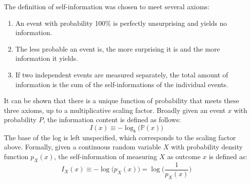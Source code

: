 \documentclass{article}
\begin{document}
  The definition of self-information was chosen to meet several axioms: 
  \begin{enumerate}
      \item An event with probability 100\% is perfectly unsurprising and yields no information.
      \item The less probable an event is, the more surprising it is and the more information it yields.
      \item If two independent events are measured separately, the total amount of information is the sum of the self-informations of the individual events. 
  \end{enumerate}
  It can be shown that there is a unique function of probability that meets these three axioms, up to a multiplicative scaling factor. Broadly given an event $x$ with probability $P$, the information content is defined as follows: 
  \[I(x) \equiv - \log_b \big( \mathbb{P}(x)\big)\]
  The base of the log is left unspecified, which corresponds to the scaling factor above. Formally, given a continuous random variable $X$ with probability density function $p_X (x)$, the self-information of measuring $X$ as outcome $x$ is defined as:
  \[I_X (x) \equiv - \log \big( p_X (x) \big) = \log \bigg(\frac{1}{p_X (x)}\bigg)\]
\end{document}
